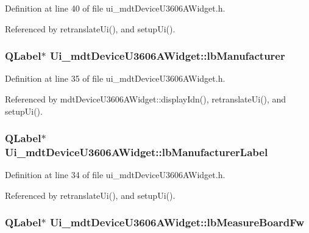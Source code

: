 Definition at line 40 of file ui\-\_\-mdt\-Device\-U3606\-A\-Widget.\-h.



Referenced by retranslate\-Ui(), and setup\-Ui().

\hypertarget{class_ui__mdt_device_u3606_a_widget_abb92b3838819db278ae17886f4da0f4e}{
\subsubsection[{lb\-Manufacturer}]{\setlength{\rightskip}{0pt plus 5cm}Q\-Label$\ast$ Ui\-\_\-mdt\-Device\-U3606\-A\-Widget\-::lb\-Manufacturer}}\label{class_ui__mdt_device_u3606_a_widget_abb92b3838819db278ae17886f4da0f4e}


Definition at line 35 of file ui\-\_\-mdt\-Device\-U3606\-A\-Widget.\-h.



Referenced by mdt\-Device\-U3606\-A\-Widget\-::display\-Idn(), retranslate\-Ui(), and setup\-Ui().

\hypertarget{class_ui__mdt_device_u3606_a_widget_a3a9a3b140349a4f4fcf9897f930d142b}{
\subsubsection[{lb\-Manufacturer\-Label}]{\setlength{\rightskip}{0pt plus 5cm}Q\-Label$\ast$ Ui\-\_\-mdt\-Device\-U3606\-A\-Widget\-::lb\-Manufacturer\-Label}}\label{class_ui__mdt_device_u3606_a_widget_a3a9a3b140349a4f4fcf9897f930d142b}


Definition at line 34 of file ui\-\_\-mdt\-Device\-U3606\-A\-Widget.\-h.



Referenced by retranslate\-Ui(), and setup\-Ui().

\hypertarget{class_ui__mdt_device_u3606_a_widget_a0e3a19572ce44c827c5f2c8cdd910aac}{
\subsubsection[{lb\-Measure\-Board\-Fw}]{\setlength{\rightskip}{0pt plus 5cm}Q\-Label$\ast$ Ui\-\_\-mdt\-Device\-U3606\-A\-Widget\-::lb\-Measure\-Board\-Fw}}\label{class_ui__mdt_device_u3606_a_widget_a0e3a19572ce44c827c5f2c8cdd910aac}


